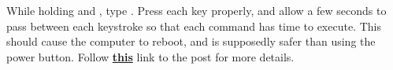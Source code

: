 While holding  and , type . Press each key properly, and allow a few seconds to pass between each keystroke so that each command has time to execute. This should cause the computer to reboot, and is supposedly safer than using the power button. Follow \href{http://askubuntu.com/questions/4408/what-should-i-do-when-ubuntu-freezes/36717#36717}{\textbf{this}} link to the post for more details.